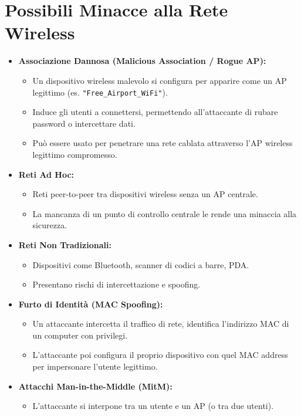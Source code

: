 \section{Possibili Minacce alla Rete Wireless}
\begin{itemize}
    \item \textbf{Associazione Dannosa (Malicious Association / Rogue AP):}
    \begin{itemize}
        \item Un dispositivo wireless malevolo si configura per apparire come un AP legittimo (es. \texttt{"Free\_Airport\_WiFi"}).
        \item Induce gli utenti a connettersi, permettendo all'attaccante di rubare password o intercettare dati.
        \item Può essere usato per penetrare una rete cablata attraverso l'AP wireless legittimo compromesso.
    \end{itemize}
    \item \textbf{Reti Ad Hoc:}
    \begin{itemize}
        \item Reti peer-to-peer tra dispositivi wireless senza un AP centrale.
        \item La mancanza di un punto di controllo centrale le rende una minaccia alla sicurezza.
    \end{itemize}
    \item \textbf{Reti Non Tradizionali:}
    \begin{itemize}
        \item Dispositivi come Bluetooth, scanner di codici a barre, PDA.
        \item Presentano rischi di intercettazione e spoofing.
    \end{itemize}
    \item \textbf{Furto di Identità (MAC Spoofing):}
    \begin{itemize}
        \item Un attaccante intercetta il traffico di rete, identifica l'indirizzo MAC di un computer con privilegi.
        \item L'attaccante poi configura il proprio dispositivo con quel MAC address per impersonare l'utente legittimo.
    \end{itemize}
    \item \textbf{Attacchi Man-in-the-Middle (MitM):}
    \begin{itemize}
        \item L'attaccante si interpone tra un utente e un AP (o tra due utenti).

\end{itemize}
\end{itemize}

